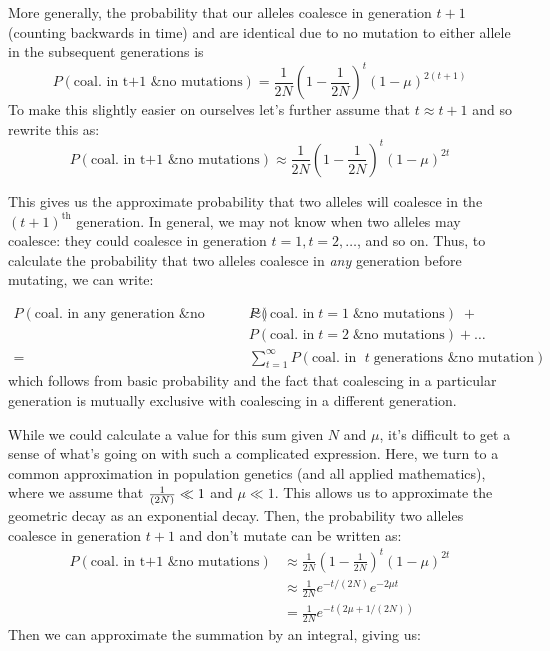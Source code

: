 More generally, the probability that our alleles coalesce in generation
$t+1$ (counting backwards in time) and are identical due to no mutation to either allele in the
subsequent generations is
%
\begin{equation}
P(\textrm{coal. in t+1 \& no mutations}) =  \frac{1}{2N} \left(1- \frac{1}{2N} \right)^t \left(1-\mu \right)^{2(t+1)}
\end{equation}
%
To make this slightly easier on ourselves let's further assume that $t
\approx t+1$ and so rewrite this as:
\begin{equation}
P(\textrm{coal. in t+1 \& no mutations}) \approx \frac{1}{2N} \left(1- \frac{1}{2N} \right)^t \left(1-\mu \right)^{2t}
\end{equation}
%

This gives us the approximate probability that two alleles will coalesce in the
$(t+1)^\text{th}$ generation. In general, we may not know when two alleles may
coalesce: they could coalesce in generation $t=1, t=2, \ldots $, and so on.
Thus, to calculate the probability that two alleles coalesce in \emph{any}
generation before mutating, we can write:

\begin{align*}
  P(\textrm{coal. in any generation \& no mutations}) \approx & P(\textrm{coal. in} \; t=1 \; \textrm{\& no mutations}) \; + \\
&  P(\textrm{coal. in} \; t=2 \; \textrm{\& no mutations}) + \ldots \\
  = & \sum_{t=1}^\infty P(\textrm{coal. in } \; t \; \textrm{generations \& no mutation})
\end{align*}
%
which follows from basic probability and the fact that coalescing in a particular generation is mutually exclusive with coalescing in a different generation.

While we could calculate a value for this sum given $N$ and $\mu$, it's
difficult to get a sense of what's going on with such a complicated expression.
Here, we turn to a common approximation in population genetics (and all applied
mathematics), where we assume that $\nicefrac{1}{(2N)} \ll 1$ and $\mu \ll 1$.
This allows us to approximate the geometric decay as an exponential decay.
Then, the probability two alleles coalesce in generation $t+1$ and don't mutate
can be written as:
%
\begin{align} P(\textrm{coal. in t+1 \& no mutations}) &\approx \frac{1}{2N}
\left(1- \frac{1}{2N} \right)^t \left(1-\mu \right)^{2t} \\
& \approx \frac{1}{2N} e^{-t/(2N)} e^{-2\mu t } \\
&=\frac{1}{2N} e^{-t(2\mu+1/(2N))} \end{align}
%
Then we can approximate the summation by an integral, giving us:
%

